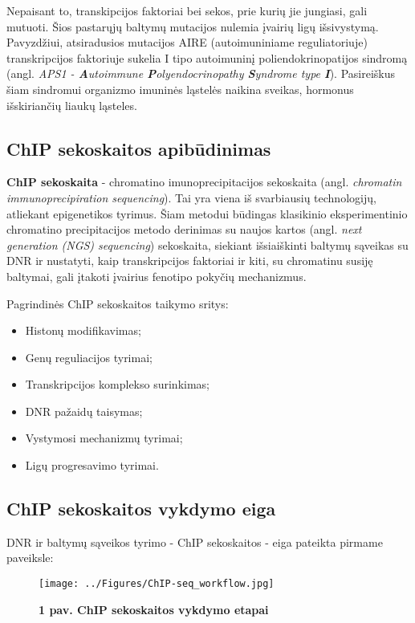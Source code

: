 \documentclass[12pt]{article}
\begin{document}
Nepaisant to, transkipcijos faktoriai bei sekos, prie kurių jie jungiasi, gali
mutuoti. Šios pastarųjų baltymų mutacijos nulemia įvairių ligų išsivystymą.
Pavyzdžiui, atsiradusios mutacijos AIRE (autoimuniniame reguliatoriuje)
transkripcijos faktoriuje sukelia I tipo autoimuninį poliendokrinopatijos
sindromą\cite{ARTICLE9} (angl. \emph{APS1 - \textbf{A}utoimmune
\textbf{P}olyendocrinopathy \textbf{S}yndrome type \textbf{I}}). Pasireiškus
šiam sindromui organizmo imuninės ląstelės naikina sveikas, hormonus
išskiriančių liaukų ląsteles\cite{ASP1}.

\subsection{ChIP sekoskaitos apibūdinimas}
\textbf{ChIP sekoskaita} - chromatino imunoprecipitacijos sekoskaita (angl.
\emph{chromatin immunoprecipiration sequencing}). Tai yra viena iš svarbiausių
technologijų, atliekant epigenetikos tyrimus\cite{ARTICLE1}. Šiam metodui
būdingas klasikinio eksperimentinio chromatino precipitacijos metodo derinimas
su naujos kartos (angl. \emph{next generation (NGS) sequencing}) sekoskaita,
siekiant išsiaiškinti baltymų sąveikas su DNR ir nustatyti, kaip transkripcijos
faktoriai ir kiti, su chromatinu susiję baltymai, gali įtakoti įvairius fenotipo
pokyčių mechanizmus\cite{ARTICLE2}.

\newpage

Pagrindinės ChIP sekoskaitos taikymo sritys\cite{ARTICLE2}:
\begin{itemize}
    \item Histonų modifikavimas;
    \item Genų reguliacijos tyrimai;
    \item Transkripcijos komplekso surinkimas;
    \item DNR pažaidų taisymas;
    \item Vystymosi mechanizmų tyrimai;
    \item Ligų progresavimo tyrimai.
\end{itemize}


\subsection{ChIP sekoskaitos vykdymo eiga}

DNR ir baltymų sąveikos tyrimo - ChIP sekoskaitos - eiga pateikta pirmame
paveiksle:

\begin{figure}[ht]
    \begin{center}
        \texttt{[image: ../Figures/ChIP-seq\_workflow.jpg]}
        \vspace{-1\baselineskip}
        \caption*{\small\textbf{1 pav. ChIP sekoskaitos vykdymo etapai}}
        \label{fig:birds}
    \end{center}
\end{figure}
\end{document}
